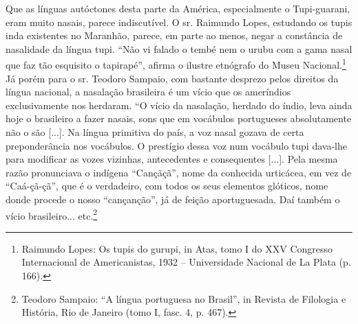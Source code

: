 Que as línguas autóctones desta parte da América, especialmente o
Tupi-guarani, eram muito nasais, parece indiscutível. O sr. Raimundo
Lopes, estudando os tupis inda existentes no Maranhão, parece, em parte
ao menos, negar a constância de nasalidade da língua tupi. ``Não vi
falado o tembé nem o urubu com a gama nasal que faz tão esquisito o
tapirapé'', afirma o ilustre etnógrafo do Museu Nacional.\footnote{Raimundo Lopes: Os tupis do gurupi, in Atas, tomo I do XXV Congresso
Internacional de Americanistas, 1932 -- Universidade Nacional de La
Plata (p. 166).} Já porém
para o sr. Teodoro Sampaio, com bastante desprezo pelos direitos da
língua nacional, a nasalação brasileira é um vício que os ameríndios
exclusivamente nos herdaram. ``O vício da nasalação, herdado do índio,
leva ainda hoje o brasileiro a fazer nasais, sons que em vocábulos
portugueses absolutamente não o são {[}...{]}. Na língua primitiva do
país, a voz nasal gozava de certa preponderância nos vocábulos. O
prestígio dessa voz num vocábulo tupi dava-lhe para modificar as vozes
vizinhas, antecedentes e consequentes {[}...{]}. Pela mesma razão
pronunciava o indígena ``Cançãçã'', nome da conhecida urticácea, em vez
de ``Caá-çã-çã'', que é o verdadeiro, com todos os seus elementos
glóticos, nome donde procede o nosso ``cançanção'', já de feição
aportuguesada. Daí também o vício brasileiro... etc.\footnote{Teodoro Sampaio: ``A língua portuguesa no Brasil'', in Revista de
Filologia e História, Rio de Janeiro (tomo I, fasc. 4, p. 467).}

